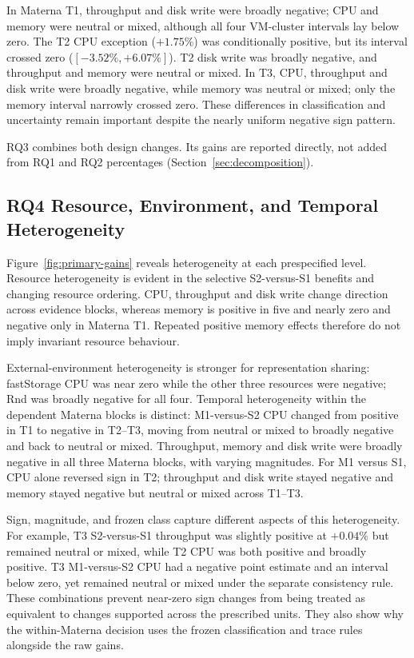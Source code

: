 \documentclass[a4paper,fleqn]{cas-dc}
\begin{document}
In Materna T1, throughput and disk write were broadly negative; CPU and memory
were neutral or mixed, although all four VM-cluster intervals lay below zero.
The T2 CPU exception ($+1.75\%$) was conditionally positive, but its interval
crossed zero ($[-3.52\%,+6.07\%]$). T2 disk write was broadly negative, and
throughput and memory were neutral or mixed. In T3, CPU, throughput and disk
write were broadly negative, while memory was neutral or mixed; only the
memory interval narrowly crossed zero. These differences in classification
and uncertainty remain important despite the nearly uniform negative sign
pattern.

RQ3 combines both design changes. Its gains are reported directly, not added
from RQ1 and RQ2 percentages (Section~\ref{sec:decomposition}).

\subsection{RQ4 Resource, Environment, and Temporal Heterogeneity}
\label{sec:results-rq4}

Figure~\ref{fig:primary-gains} reveals heterogeneity at each prespecified
level. Resource heterogeneity is evident in the selective S2-versus-S1
benefits and changing resource ordering. CPU, throughput and disk write change
direction across evidence blocks, whereas memory is positive in five and
nearly zero and negative only in Materna T1. Repeated positive memory effects
therefore do not imply invariant resource behaviour.

External-environment heterogeneity is stronger for representation sharing: fastStorage
CPU was near zero while the other three resources were negative; Rnd was
broadly negative for all four. Temporal heterogeneity within the dependent
Materna blocks is distinct: M1-versus-S2 CPU changed from positive in T1 to
negative in T2--T3, moving from neutral or mixed to broadly negative and back
to neutral or mixed. Throughput, memory and disk write were broadly negative
in all three Materna blocks, with varying magnitudes. For M1 versus S1, CPU
alone reversed sign in T2; throughput and disk write stayed negative and
memory stayed negative but neutral or mixed across T1--T3.

Sign, magnitude, and frozen class capture different aspects of this
heterogeneity. For example, T3 S2-versus-S1 throughput was slightly positive at
$+0.04\%$ but remained neutral or mixed, while T2 CPU was both positive and
broadly positive. T3 M1-versus-S2 CPU had a negative point estimate and an
interval below zero, yet remained neutral or mixed under the separate
consistency rule. These combinations prevent near-zero sign changes from being
treated as equivalent to changes supported across the prescribed units. They
also show why the within-Materna decision uses the frozen classification and
trace rules alongside the raw gains.
\end{document}
